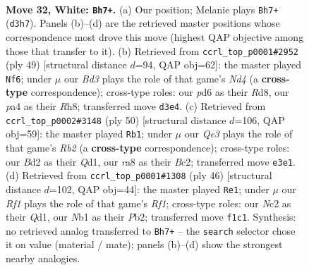 \documentclass[11pt]{article}
\begin{document}
\clearpage

\begin{figure}[p]\centering
\begin{subfigure}{0.46\textwidth}\centering
\resizebox{\linewidth}{!}{%
\newchessgame
\chessboard[
  setfen={r2q1rk1/3n1pb1/3p4/1Ppb3p/p5nP/P2BQ1P1/1PNB4/RN3RK1 w - - 2 32},
  showmover=false,
  pgfstyle=straightmove, color=movearrow, markmove={d3-h7}
]}
\caption{}
\end{subfigure}\hfill
\begin{subfigure}{0.46\textwidth}\centering
\resizebox{\linewidth}{!}{%
\newchessgame
\chessboard[
  setfen={2kr3r/1b2bp2/1q6/1p1np1p1/2n4p/1NP4P/1PBB1PPN/R2QR1K1 b - - 1 25},
  showmover=false,
  pgfstyle=straightmove, color=movearrow, markmove={d5-f6}
]}
\caption{}
\end{subfigure}
\\[4pt]
\begin{subfigure}{0.46\textwidth}\centering
\resizebox{\linewidth}{!}{%
\newchessgame
\chessboard[
  setfen={2qrr1k1/1pn2pp1/2n1b2p/p3p3/P3N3/b1PP1N1P/1RBB1PP1/3QR1K1 w - - 13 26},
  showmover=false,
  pgfstyle=straightmove, color=movearrow, markmove={b2-b1}
]}
\caption{}
\end{subfigure}\hfill
\begin{subfigure}{0.46\textwidth}\centering
\resizebox{\linewidth}{!}{%
\newchessgame
\chessboard[
  setfen={r3r1k1/pp4b1/3p1n1p/Pb1Pqpn1/5N2/R3B1P1/1P2N1BP/3Q1RK1 w - - 6 24},
  showmover=false,
  pgfstyle=straightmove, color=movearrow, markmove={f1-e1}
]}
\caption{}
\end{subfigure}
\caption{\textbf{Move 32, White: \texttt{Bh7+}.} (a) Our position; Melanie plays \texttt{Bh7+} (\texttt{d3h7}). Panels (b)--(d) are the retrieved master positions whose correspondence most drove this move (highest QAP objective among those that transfer to it). (b) Retrieved from \texttt{ccrl\_top\_p0001\#2952} (ply 49) [structural distance $d$=94, QAP obj=62]: the master played \texttt{Nf6}; under $\mu$ our \emph{Bd3} plays the role of that game's \emph{Nd4} (a \textbf{cross-type} correspondence); cross-type roles: our \emph{p}d6 as their \emph{R}d8, our \emph{p}a4 as their \emph{R}h8; transferred move \texttt{d3e4}. (c) Retrieved from \texttt{ccrl\_top\_p0002\#3148} (ply 50) [structural distance $d$=106, QAP obj=59]: the master played \texttt{Rb1}; under $\mu$ our \emph{Qe3} plays the role of that game's \emph{Rb2} (a \textbf{cross-type} correspondence); cross-type roles: our \emph{B}d2 as their \emph{Q}d1, our \emph{r}a8 as their \emph{B}c2; transferred move \texttt{e3e1}. (d) Retrieved from \texttt{ccrl\_top\_p0001\#1308} (ply 46) [structural distance $d$=102, QAP obj=44]: the master played \texttt{Re1}; under $\mu$ our \emph{Rf1} plays the role of that game's \emph{Rf1}; cross-type roles: our \emph{N}c2 as their \emph{Q}d1, our \emph{N}b1 as their \emph{P}b2; transferred move \texttt{f1c1}. Synthesis: no retrieved analog transferred to \texttt{Bh7+} -- the \texttt{search} selector chose it on value (material / mate); panels (b)--(d) show the strongest nearby analogies.}
\label{fig:thought-m62}
\end{figure}
\end{document}
